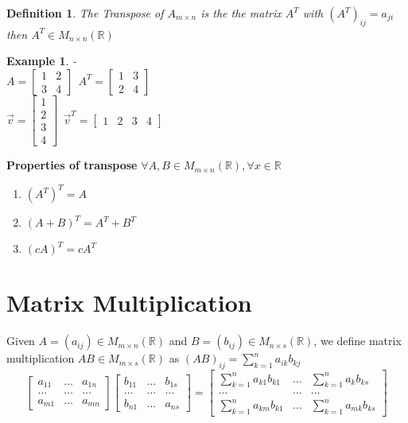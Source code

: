 \documentclass{article}
\newtheorem{ex}[theorem]{Example}
\newtheorem{definition}[theorem]{Definition}
\begin{document}
\begin{definition}
The Transpose of \( A_{m \times n}\) is the the matrix \( A^T\) with \( (A^T)_{ij} = a_{ji} \) then \( A^T \in M_{n \times n} (\mathbb{R}) \)
\end{definition}

\begin{ex} - \\
\( A = \begin{bmatrix} 1 & 2 \\ 3 & 4 \end{bmatrix}    \ \ A^T = \begin{bmatrix} 1 & 3 \\ 2 & 4 \end{bmatrix}\) \\
\( \vec{v} = \begin{bmatrix} 1 \\ 2 \\ 3 \\ 4 \end{bmatrix}  \ \ \vec{v}^T = \begin{bmatrix}1 & 2 & 3 & 4 \end{bmatrix}\)
\end{ex}

\textbf{Properties of transpose } \( \forall A, B \in M_{m \times n} (\mathbb{R}) , \forall x \in \mathbb{R} \) 
\begin{enumerate}
\item \( (A^T)^T = A\)
\item \( (A+B)^T = A^T + B^T\)
\item \( (cA)^T = cA^T\)
\end{enumerate}

\section{Matrix Multiplication}
Given \(A = (a_{ij}) \in M_{m \times n} (\mathbb{R})  \) and  \(B = (b_{ij}) \in M_{n \times s} (\mathbb{R})  \), we define matrix multiplication 
\( AB \in M_{m \times s} (\mathbb{R})  \) as \((AB)_{ij} = \sum_{k=1}^{n} a_{ik} b_{kj} \)
\[\begin{bmatrix} a_{11} & \ldots & a_{1n} \\ \ldots & \ldots & \ldots  \\ a_{m1} & \ldots & a_{mn}  \end{bmatrix} \begin{bmatrix} b_{11} & \ldots & b_{1s} \\ \ldots & \ldots & \ldots  \\ b_{n1} & \ldots & a_{ns}  \end{bmatrix} = \begin{bmatrix} \sum_{k=1}^{n} a_{k1} b_{k1} & \ldots & \sum_{k=1}^{n} a_{k} b_{ks}\\ \ldots & \ldots & \ldots  \\ \sum_{k=1}^{n} a_{km} b_{k1} & \ldots & \sum_{k=1}^{n} a_{mk} b_{ks}  \end{bmatrix}\] 
\end{document}
